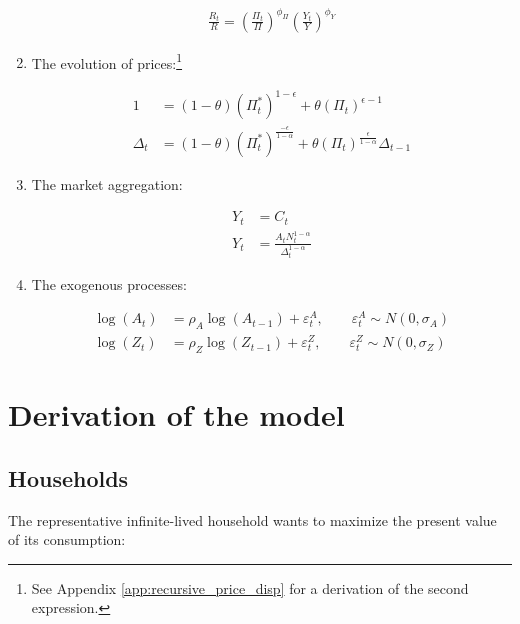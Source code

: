 \documentclass[11pt]{article}
\begin{document}
\begin{enumerate}
\begin{align}
\frac{R_t}{R}=\left(\frac{\Pi_t}{\Pi}\right)^{\phi_{\Pi}}\left(\frac{Y_t}{Y}\right)^{\phi_Y}\label{eq7}
\end{align}

\item The evolution of prices:\footnote{See Appendix \ref{app:recursive_price_disp} for a derivation of the second expression.}

\begin{align}
1&=(1-\theta)(\Pi_t^*)^{1-\epsilon}+\theta(\Pi_t)^{\epsilon-1}\label{eq8}\\
\Delta_t&=(1-\theta)(\Pi_t^*)^{\frac{-\epsilon}{1-\alpha}}+\theta(\Pi_t)^{\frac{\epsilon}{1-\alpha}}\Delta_{t-1}\label{eq9}
\end{align}

\item The market aggregation:

\begin{align}
Y_t&=C_t\label{eq10}\\
Y_t&=\frac{A_tN_t^{1-\alpha}}{\Delta_t^{1-\alpha}}\label{eq11}
\end{align}

\item The exogenous processes:

\begin{align}
\log(A_t)&=\rho_A\log(A_{t-1})+\varepsilon_t^A, \qquad \varepsilon_t^A \sim N(0,\sigma_A)
\label{eq12}\\
\log(Z_t)&=\rho_Z\log(Z_{t-1})+\varepsilon_t^Z, \qquad \varepsilon_t^Z \sim N(0,\sigma_Z)\label{eq13}
\end{align}

\end{enumerate}





\appendix

\section{Derivation of the model}\label{app:derivation}

\subsection*{Households}

The representative infinite-lived household wants to maximize the present value of its consumption:
\end{document}
